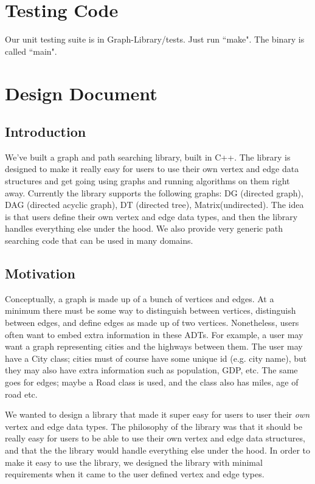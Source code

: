 \documentclass{article}
\begin{document}
\section{Testing Code}
Our unit testing suite is in Graph-Library/tests. Just run ``make". The binary is called ``main".

\section{Design Document}

\subsection{Introduction}
We've built a graph and path searching library, built in C++. The library is designed to make it really easy for users to use their own vertex and edge data structures and get going using graphs and running algorithms on them right away. Currently the library supports the following graphs: DG (directed graph), DAG (directed acyclic graph), DT (directed tree), Matrix(undirected). The idea is that users define their own vertex and edge data types, and then the library handles everything else under the hood. We also provide very generic path searching code that can be used in many domains. 

\subsection{Motivation}
Conceptually, a graph is made up of a bunch of vertices and edges. At a minimum there must be some way to distinguish between vertices, distinguish between edges, and define edges as made up of two vertices. Nonetheless, users often want to embed extra information in these ADTs. For example, a user may want a graph representing cities and the highways between them. The user may have a City class; cities must of course have some unique id (e.g. city name), but they may also have extra information such as population, GDP, etc. The same goes for edges; maybe a Road class is used, and the class also has miles, age of road etc. 
\par
We wanted to design a library that made it super easy for users to user their \emph{own} vertex and edge data types.
The philosophy of the library was that it should be really easy for users to be able to use their own vertex and edge data structures, and that the the library would handle everything else under the hood. In order to make it easy to use the library, we designed the library with minimal requirements when it came to the user defined vertex and edge types. 
\end{document}
